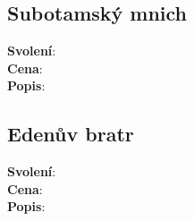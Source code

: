 \begin{itemize}
\begin{tcolorbox}
\subsection{Subotamský mnich}
\label{sec:pov-subotam}
\textbf{Svolení}:\\
\textbf{Cena}:\\
\textbf{Popis}:\\
\end{tcolorbox}

\begin{tcolorbox}
\subsection{Edenův bratr}
\label{sec:pov-edenak}
\textbf{Svolení}:\\
\textbf{Cena}:\\
\textbf{Popis}:\\
\end{tcolorbox}

\end{itemize}





